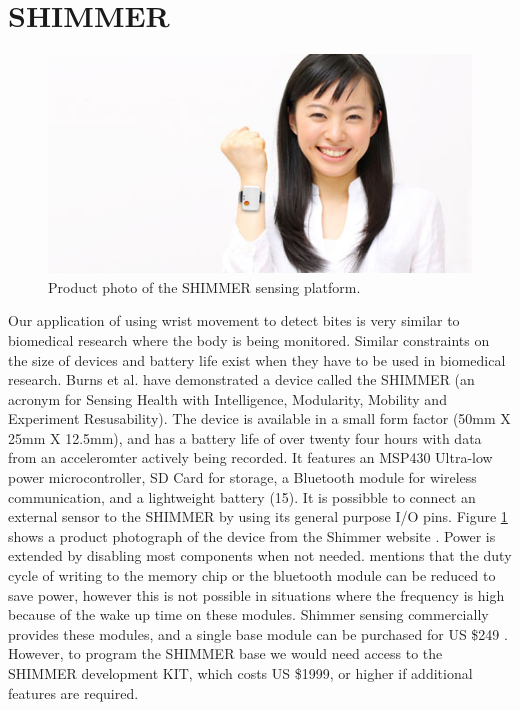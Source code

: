 \section{SHIMMER}
\label{Sec:Shimmer}
\begin{figure}
\begin{center}
\includegraphics{images/shimmerphoto.jpg}
\caption{Product photo of the SHIMMER sensing platform.}
\label{Fig:ShimmerHand}
\end{center}
\end{figure}
Our application of using wrist movement to detect bites is very similar to biomedical research where the body is being monitored.
Similar constraints on the size of devices and battery life exist when they have to be used in biomedical research.
Burns et al. \cite{burns2010shimmer} have demonstrated a device called the SHIMMER
(an acronym for Sensing Health with Intelligence, Modularity, Mobility and Experiment Resusability).
The device is available in a small form factor (50mm X 25mm X 12.5mm),
and has a battery life of over twenty four hours with data from an acceleromter actively being recorded.
It features an MSP430 Ultra-low power microcontroller,
SD Card for storage,
a Bluetooth module for wireless communication,
and a lightweight battery (15).
It is possibble to connect an external sensor to the SHIMMER by using its general purpose I/O pins.
Figure \ref{Fig:ShimmerHand} shows a product photograph of the device from the Shimmer website \cite{Web:ShimmerBuyKit}.
Power is extended by disabling most components when not needed.
\cite{burns2010shimmer} mentions that the duty cycle of writing to the memory chip or the bluetooth module can be reduced to save power,
however this is not possible in situations where the frequency is high because of the wake up time on these modules.
Shimmer sensing commercially provides these modules,
and a single base module can be purchased for US \$249 \cite{Web:ShimmerBuy}.
However, to program the SHIMMER base we would need access to the SHIMMER development KIT,
which costs US \$1999, or higher if additional features are required.

